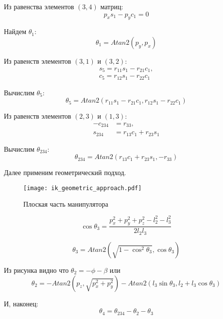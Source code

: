 Из равенства элементов $(3,4)$ матриц: 
\begin{equation}
	p_{x} s_{1} - p_{y} c_{1} = 0
\end{equation}

Найдем $\theta_1$:
\begin{equation}
	\theta_1 = Atan2(p_y, p_x)
\end{equation}

Из равенств элементов $(3,1)$ и $(3,2)$:
\begin{align*}
	s_{5} = r_{11} s_{1} - r_{21} c_{1},\\
	c_{5} =  r_{12} s_{1} - r_{22} c_{1}
\end{align*}

Вычислим $\theta_5$:
\begin{equation}
	\theta_5 = Atan2(r_{11} s_{1} - r_{21} c_{1}, r_{12} s_{1} - r_{22} c_{1})
\end{equation}

Из равенств элементов $(2,3)$ и $(1,3)$:
\begin{align*}
	- c_{234} &= r_{33},\\
	s_{234} &= r_{13} c_{1} + r_{23} s_{1}
\end{align*}

Вычислим $\theta_{234}$:
\begin{equation}
	\theta_{234} = Atan2(r_{13} c_{1} + r_{23} s_{1}, -r_{33}) 
\end{equation}

Далее применим геометрический подход.
\begin{figure}[h]
	\centering
	\texttt{[image: ik\_geometric\_approach.pdf]}
	\caption{Плоская часть манипулятора}
	\label{ik_geometric}
\end{figure}

\begin{equation}
	\cos{\theta_3} = \frac{p_x^2 + p_y^2 + p_z^2 - l_2^2 - l_3^2}{2 l_2 l_3}
\end{equation}

\begin{equation}
	\theta_3 = Atan2(\sqrt{1 - \cos^2{\theta_3}}, \cos{\theta_3})
\end{equation}

Из рисунка видно что $\theta_2 = -\phi - \beta$ или
\begin{equation}
	\theta_2 = -Atan2(p_z, \sqrt{p_x^2 + p_y^2}) - Atan2(l_3 \sin{\theta_3}, l_2 + l_3 \cos{\theta_3})
\end{equation}

И, наконец:
\begin{equation}
	\theta_4 = \theta_{234} - \theta_{2} - \theta_{3}
\end{equation}



\newpage